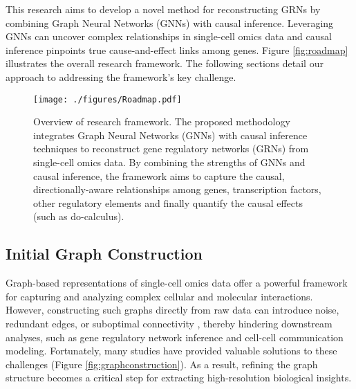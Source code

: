 
This research aims to develop a novel method for reconstructing GRNs by combining Graph Neural Networks (GNNs) with causal inference. Leveraging GNNs can uncover complex relationships in single-cell omics data and causal inference pinpoints true cause-and-effect links among genes. Figure \ref{fig:roadmap} illustrates the overall research framework. The following sections detail our approach to addressing the framework's key challenge.

\begin{figure}[htbp]
    \centering
    \texttt{[image: ./figures/Roadmap.pdf]}
    \caption{
        Overview of research framework. The proposed methodology integrates Graph Neural Networks (GNNs) with causal inference techniques to reconstruct gene regulatory networks (GRNs) from single-cell omics data. By combining the strengths of GNNs and causal inference, the framework aims to capture the causal, directionally-aware relationships among genes, transcription factors, other regulatory elements and finally quantify the causal effects (such as do-calculus).
    }
    \label{fig:researchframework}
\end{figure}

\subsection{Initial Graph Construction}

Graph-based representations of single-cell omics data offer a powerful framework for capturing and analyzing complex cellular and molecular interactions. However, constructing such graphs directly from raw data can introduce noise, redundant edges, or suboptimal connectivity \cite{wang2023gene,wang2025diffusion,dibaeinia2025interpretable}, thereby hindering downstream analyses, such as gene regulatory network inference and cell-cell communication modeling. Fortunately, many studies have provided valuable solutions to these challenges \cite{cheng2022scgac,wang2018network,li2023single,fan2024scgraphformer} (Figure \ref{fig:graphconstruction}). As a result, refining the graph structure becomes a critical step for extracting high-resolution biological insights. 

